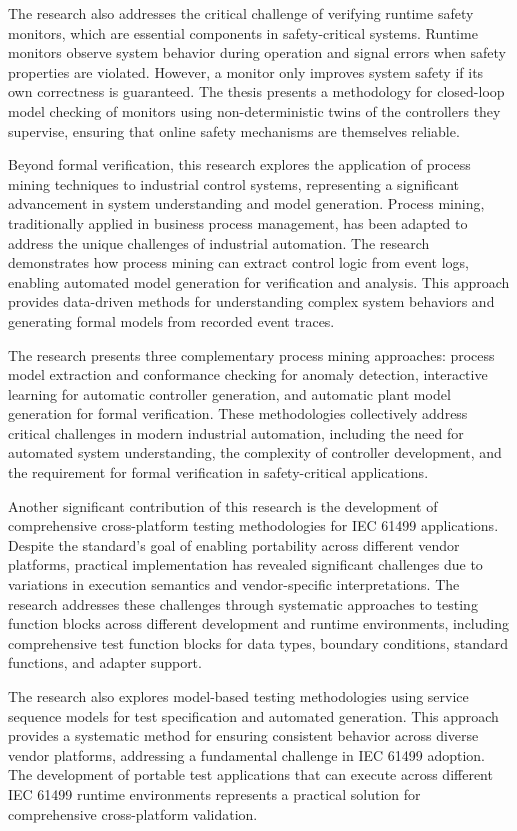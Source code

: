 The research also addresses the critical challenge of verifying runtime safety monitors, which are essential components in safety-critical systems. Runtime monitors observe system behavior during operation and signal errors when safety properties are violated. However, a monitor only improves system safety if its own correctness is guaranteed. The thesis presents a methodology for closed-loop model checking of monitors using non-deterministic twins of the controllers they supervise, ensuring that online safety mechanisms are themselves reliable.

Beyond formal verification, this research explores the application of process mining techniques to industrial control systems, representing a significant advancement in system understanding and model generation. Process mining, traditionally applied in business process management, has been adapted to address the unique challenges of industrial automation. The research demonstrates how process mining can extract control logic from event logs, enabling automated model generation for verification and analysis. This approach provides data-driven methods for understanding complex system behaviors and generating formal models from recorded event traces.

The research presents three complementary process mining approaches: process model extraction and conformance checking for anomaly detection, interactive learning for automatic controller generation, and automatic plant model generation for formal verification. These methodologies collectively address critical challenges in modern industrial automation, including the need for automated system understanding, the complexity of controller development, and the requirement for formal verification in safety-critical applications.

Another significant contribution of this research is the development of comprehensive cross-platform testing methodologies for IEC 61499 applications. Despite the standard's goal of enabling portability across different vendor platforms, practical implementation has revealed significant challenges due to variations in execution semantics and vendor-specific interpretations. The research addresses these challenges through systematic approaches to testing function blocks across different development and runtime environments, including comprehensive test function blocks for data types, boundary conditions, standard functions, and adapter support.

The research also explores model-based testing methodologies using service sequence models for test specification and automated generation. This approach provides a systematic method for ensuring consistent behavior across diverse vendor platforms, addressing a fundamental challenge in IEC 61499 adoption. The development of portable test applications that can execute across different IEC 61499 runtime environments represents a practical solution for comprehensive cross-platform validation.

